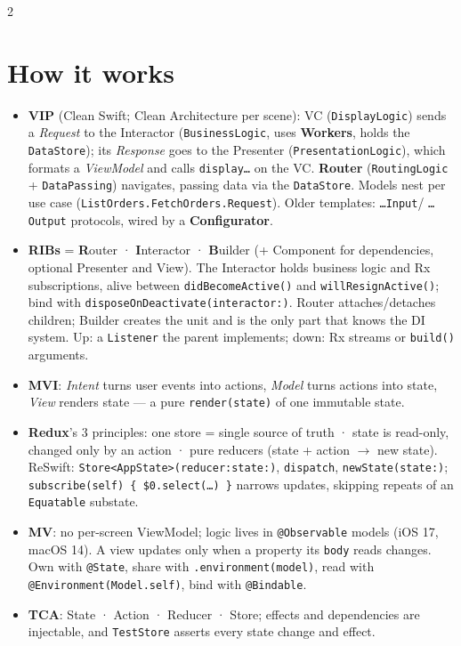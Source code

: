 \documentclass[8pt]{extarticle}
\begin{document}
\begin{multicols}{2}
\raggedright

\section{How it works}
\begin{itemize}
  \item \textbf{VIP} (Clean Swift; Clean Architecture per scene): VC
        (\texttt{DisplayLogic}) sends a \emph{Request} to the Interactor (\texttt{BusinessLogic},
        uses \textbf{Workers}, holds the \texttt{DataStore}); its \emph{Response} goes to the
        Presenter (\texttt{PresentationLogic}), which formats a \emph{ViewModel} and calls
        \texttt{display…} on the VC. \textbf{Router} (\texttt{RoutingLogic} +
        \texttt{DataPassing}) navigates, passing data via the \texttt{DataStore}. Models nest per
        use case (\texttt{ListOrders.FetchOrders.Request}). Older templates: \texttt{…Input}/%
        \texttt{…Output} protocols, wired by a \textbf{Configurator}.
  \item \textbf{RIBs} = \textbf{R}outer · \textbf{I}nteractor · \textbf{B}uilder (+ Component for
        dependencies, optional Presenter and View). The Interactor holds business logic and Rx
        subscriptions, alive between \texttt{didBecomeActive()} and \texttt{willResignActive()};
        bind with \texttt{disposeOnDeactivate(interactor:)}. Router attaches/detaches children;
        Builder creates the unit and is the only part that knows the DI system. Up: a
        \texttt{Listener} the parent implements; down: Rx streams or \texttt{build()} arguments.
  \item \textbf{MVI}: \emph{Intent} turns user events into actions, \emph{Model} turns actions
        into state, \emph{View} renders state — a pure \texttt{render(state)} of one immutable
        state.
  \item \textbf{Redux}'s 3 principles: one store = single source of truth · state is
        read-only, changed only by an action · pure reducers (state + action $\to$ new
        state). ReSwift: \texttt{Store<AppState>(reducer:state:)}, \texttt{dispatch},
        \texttt{newState(state:)}; \texttt{subscribe(self) \{ \$0.select(…) \}} narrows
        updates, skipping repeats of an \texttt{Equatable} substate.
  \item \textbf{MV}: no per-screen ViewModel; logic lives in \texttt{@Observable} models
        (iOS 17, macOS 14). A view updates only when a property its \texttt{body} reads
        changes. Own with \texttt{@State}, share with \texttt{.environment(model)}, read with
        \texttt{@Environment(Model.self)}, bind with \texttt{@Bindable}.
  \item \textbf{TCA}: State · Action · Reducer · Store; effects and dependencies are
        injectable, and \texttt{TestStore} asserts every state change and effect.
\end{itemize}


\end{multicols}
\end{document}
